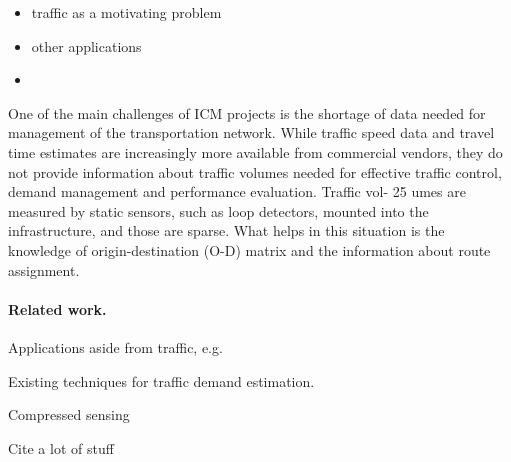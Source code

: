 \documentclass{article} %
\begin{document}
\begin{itemize}
\item traffic as a motivating problem
\item other applications
\item 
\end{itemize}

One of the main challenges of ICM projects is the shortage of data needed for management
of the transportation network. While traffic speed data and travel time estimates are increasingly more available from commercial vendors, they do not provide information about traffic volumes needed for effective traffic control, demand management and performance evaluation. Traffic vol-
25 umes are measured by static sensors, such as loop detectors, mounted into the infrastructure, and those are sparse. What helps in this situation is the knowledge of origin-destination (O-D) matrix and the information about route assignment.


\paragraph{Related work.}
Applications aside from traffic, e.g.

Existing techniques for traffic demand estimation.

Compressed sensing

Cite a lot of stuff
\end{document}
